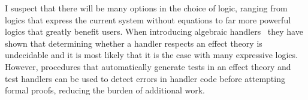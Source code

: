 \documentclass{article}
\begin{document}
I suspect that there will be many options in the choice of logic, ranging from logics that express the current system without equations to far more powerful logics that greatly benefit users. When introducing algebraic handlers~\cite{DBLP:conf/esop/PlotkinP09} they have shown that determining whether a handler respects an effect theory is undecidable and it is most likely that it is the case with many expressive logics. However, procedures that automatically generate tests in an effect theory and test handlers can be used to detect errors in handler code before attempting formal proofs, reducing the burden of additional work.



\end{document}
